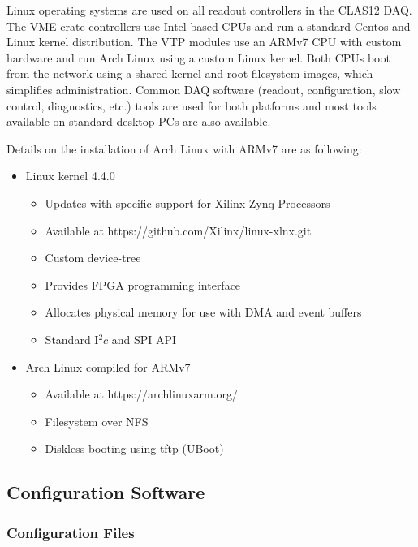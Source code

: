 Linux operating systems are used on all readout controllers in the CLAS12 DAQ. The VME crate controllers use
Intel-based CPUs and run a standard Centos and Linux kernel distribution. The VTP modules use an ARMv7 CPU
with custom hardware and run Arch Linux using a custom Linux kernel. Both CPUs boot from the network using a
shared kernel and root filesystem images, which simplifies administration. Common DAQ software (readout,
configuration, slow control, diagnostics, etc.) tools are used for both platforms and most tools available on
standard desktop PCs are also available.

Details on the installation of Arch Linux with ARMv7 are as following:

\begin{itemize}
\item Linux kernel 4.4.0
  \begin{itemize}
  \item Updates with specific support for Xilinx Zynq Processors
  \item Available at https://github.com/Xilinx/linux-xlnx.git
  \item Custom device-tree
  \item Provides FPGA programming interface
  \item Allocates physical memory for use with DMA and event buffers
  \item Standard I$^2c$ and SPI API
  \end{itemize}

\item Arch Linux compiled for ARMv7
  \begin{itemize}
  \item Available at https://archlinuxarm.org/
  \item Filesystem over NFS
  \item Diskless booting using tftp (UBoot)
  \end{itemize}
\end{itemize}

\subsection{Configuration Software}

\subsubsection{Configuration Files}

